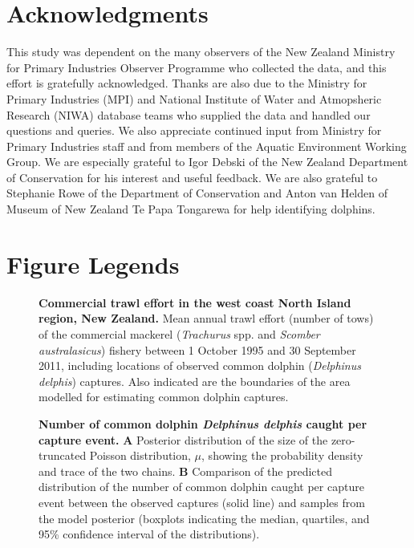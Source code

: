 \documentclass[10pt]{article}
\begin{document}
\section*{Acknowledgments}
This study was dependent on the many observers of the New Zealand Ministry for Primary Industries
Observer Programme 
who collected the data, and this effort is gratefully
acknowledged.  Thanks are also due to the Ministry for Primary Industries (MPI) and National Institute of Water and Atmopsheric Research (NIWA)
database teams who supplied the data and handled our questions and queries. We
also appreciate continued input from Ministry for Primary Industries staff and from
members of the Aquatic Environment Working Group.  We are especially grateful to Igor
Debski of the New Zealand Department of Conservation for his interest and useful feedback. 
We are also grateful to Stephanie
Rowe of the Department of Conservation and Anton van Helden of Museum of New Zealand Te Papa Tongarewa for help 
identifying dolphins.  

{}
\clearpage

\section*{Figure Legends}

\begin{figure}[!ht]
\begin{center}
\label{fig:pel-on-trip-effort}
\label{fig:pel-on-trip-obs}
\end{center}
\caption{{\bf Commercial trawl effort in the west coast North Island region, New Zealand.} 
Mean annual trawl effort (number of tows) of the commercial mackerel (\emph{Trachurus} spp. and \emph{Scomber australasicus}) fishery between 1 October 1995 and 30 September 2011, including locations of observed common dolphin (\emph{Delphinus delphis}) captures.  Also indicated are the boundaries of the area modelled for estimating common dolphin captures.}
\label{fig:pel-trip-effort}
\end{figure}

\begin{figure}[!ht]
\begin{center}

\end{center}
\caption{{\bf Number of common dolphin \emph{Delphinus delphis} caught per capture event.} {\bf A} Posterior
distribution of the size of the zero-truncated Poisson distribution, $\mu$, showing the
probability density and trace of the two chains. {\bf B} Comparison of the predicted 
distribution of the number of common dolphin caught per capture event between the observed captures (solid line) and samples from the model posterior (boxplots indicating
the median, quartiles, and 95\% confidence interval of the distributions).}
\label{fig:mean-of-poisson}
\end{figure}
\end{document}

